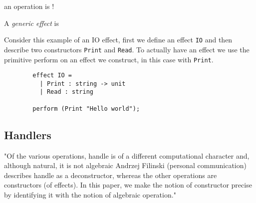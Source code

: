 \begin{definition}
    an operation is !
\end{definition}

\begin{definition}
    A \textit{generic effect} is
\end{definition}

\begin{example}
    Consider this example of an IO effect,
    first we define an effect \texttt{IO}
    and then describe two constructors
    \texttt{Print} and \texttt{Read}.
    To actually have an effect we use the primitive
    perform on an effect we construct, in this case with \texttt{Print}.
    \begin{verbatim}
        effect IO =
          | Print : string -> unit
          | Read : string

        perform (Print "Hello world");
    \end{verbatim}
\end{example}

\subsection{Handlers}
"Of the various operations, handle is of a different computational character and, although natural, it is not algebraic
Andrzej Filinski (personal communication) describes handle as a deconstructor, whereas the other operations are constructors (of effects). In this paper, we make the notion of constructor precise by identifying it with the notion of algebraic operation."





\cite{Plotkin:2002dw}



